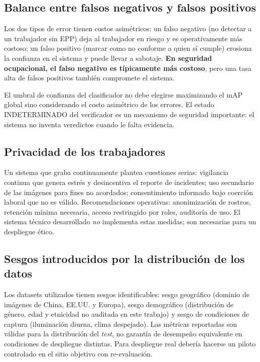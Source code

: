 \documentclass[conference]{IEEEtran}
\begin{document}
\subsection{Balance entre falsos negativos y falsos positivos}

Los dos tipos de error tienen costos asimétricos: un falso negativo
(no detectar a un trabajador sin EPP) deja al trabajador en riesgo y
es operativamente más costoso; un falso positivo (marcar como no
conforme a quien sí cumple) erosiona la confianza en el sistema y
puede llevar a sabotaje. \textbf{En seguridad ocupacional, el falso
negativo es típicamente más costoso}, pero una tasa alta de falsos
positivos también compromete el sistema.

El umbral de confianza del clasificador no debe elegirse maximizando
el mAP global sino considerando el costo asimétrico de los errores.
El estado INDETERMINADO del verificador es un mecanismo de seguridad
importante: el sistema no inventa veredictos cuando le falta evidencia.

\subsection{Privacidad de los trabajadores}

Un sistema que graba continuamente plantea cuestiones serias:
vigilancia continua que genera estrés y desincentiva el reporte de
incidentes; uso secundario de las imágenes para fines no acordados;
consentimiento informado bajo coerción laboral que no es válido.
Recomendaciones operativas: anonimización de rostros, retención
mínima necesaria, acceso restringido por roles, auditoría de uso.
El sistema técnico desarrollado \emph{no} implementa estas medidas;
son necesarias para un despliegue ético.

\subsection{Sesgos introducidos por la distribución de los datos}

Los datasets utilizados tienen sesgos identificables: sesgo geográfico
(dominio de imágenes de China, EE.UU. y Europa), sesgo demográfico
(distribución de género, edad y etnicidad no auditada en este
trabajo) y sesgo de condiciones de captura (iluminación diurna,
clima despejado). Las métricas reportadas son válidas para la
distribución del \emph{test}, no garantía de desempeño equivalente
en condiciones de despliegue distintas. Para despliegue real
debería hacerse un piloto controlado en el sitio objetivo con
re-evaluación.
\end{document}
